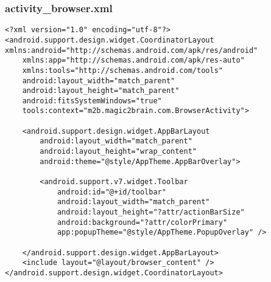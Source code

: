 \subsubsection{activity\_browser.xml}
\begin{lstlisting}
<?xml version="1.0" encoding="utf-8"?>
<android.support.design.widget.CoordinatorLayout xmlns:android="http://schemas.android.com/apk/res/android"
    xmlns:app="http://schemas.android.com/apk/res-auto"
    xmlns:tools="http://schemas.android.com/tools"
    android:layout_width="match_parent"
    android:layout_height="match_parent"
    android:fitsSystemWindows="true"
    tools:context="m2b.magic2brain.com.BrowserActivity">

    <android.support.design.widget.AppBarLayout
        android:layout_width="match_parent"
        android:layout_height="wrap_content"
        android:theme="@style/AppTheme.AppBarOverlay">

        <android.support.v7.widget.Toolbar
            android:id="@+id/toolbar"
            android:layout_width="match_parent"
            android:layout_height="?attr/actionBarSize"
            android:background="?attr/colorPrimary"
            app:popupTheme="@style/AppTheme.PopupOverlay" />

    </android.support.design.widget.AppBarLayout>
    <include layout="@layout/browser_content" />
</android.support.design.widget.CoordinatorLayout>
\end{lstlisting}

